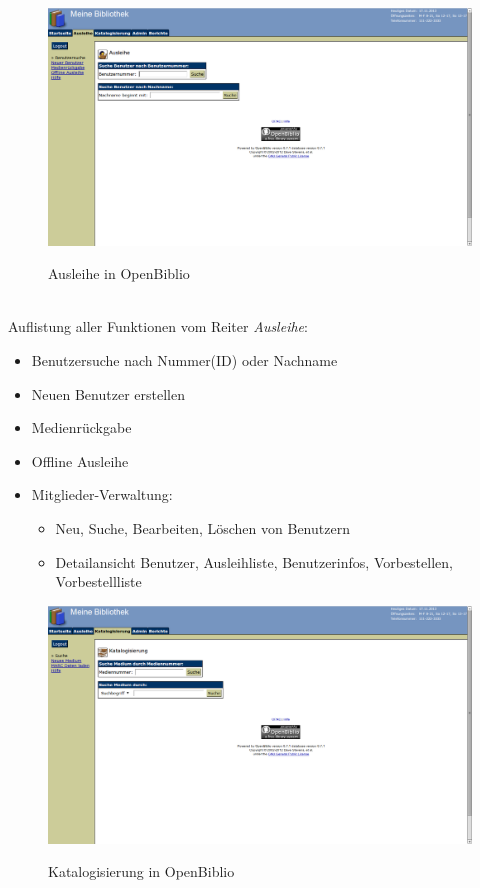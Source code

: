 \documentclass[fontsize=12pt,paper=a4,twoside]{scrartcl}
\begin{document}
\\
\begin{figure}[h]
\caption{Ausleihe in OpenBiblio}
\includegraphics[width=1\textwidth]{OpenBiblio/reiter_ausleihe.png}
\label{ausleihe-openbiblio}
\end{figure}
\\
Auflistung aller Funktionen vom Reiter \emph{Ausleihe}:
\begin{itemize}
	\item Benutzersuche nach Nummer(ID) oder Nachname
	\item Neuen Benutzer erstellen
	\item Medienrückgabe
	\item Offline Ausleihe
	\item Mitglieder-Verwaltung:
	\begin{itemize}
		\item Neu, Suche, Bearbeiten, Löschen von Benutzern
		\item Detailansicht Benutzer, Ausleihliste, Benutzerinfos, Vorbestellen, Vorbestellliste
	\end{itemize}
\end{itemize}
\newpage
\begin{figure}[h]
\caption{Katalogisierung in OpenBiblio}
\includegraphics[width=1\textwidth]{OpenBiblio/reiter_katalogisierung.png}
  \label{katalogisierung-openbiblio}
\end{figure}
\end{document}
